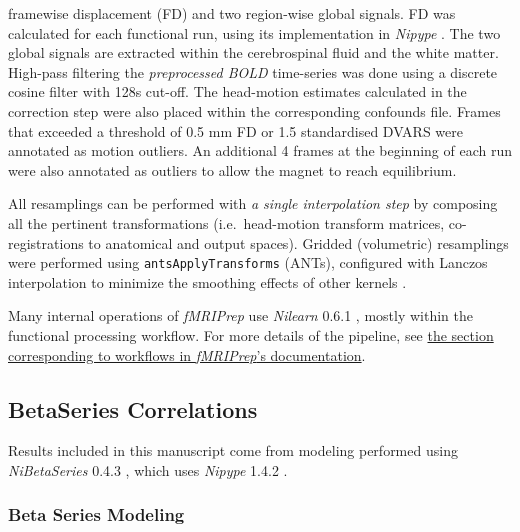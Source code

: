 \documentclass[10pt,letterpaper]{article}
\begin{document}
\begin{description}
framewise displacement (FD) and two region-wise global signals.
FD was calculated for each functional run, using its
implementation in \emph{Nipype} \cite[following the definitions
by]{power_fd_dvars}.
The two global signals are extracted within the
cerebrospinal fluid and the white matter.
High-pass filtering the \emph{preprocessed BOLD} time-series was done using
a discrete cosine filter with 128s cut-off.
The head-motion estimates calculated in
the correction step were also placed within the corresponding confounds file. 
Frames that exceeded a threshold of 0.5 mm FD or 1.5 standardised DVARS
were annotated as motion outliers.
An additional 4 frames at the beginning of each run were also
annotated as outliers to allow the magnet to reach equilibrium.

All resamplings can be performed with \emph{a single interpolation step} by composing all the pertinent
transformations (i.e.~head-motion transform matrices, co-registrations to anatomical
and output spaces).
Gridded (volumetric) resamplings were performed using \texttt{antsApplyTransforms} (ANTs),
configured with Lanczos interpolation to minimize the smoothing effects of other kernels
\cite{lanczos}.
\end{description}

Many internal operations of \emph{fMRIPrep} use \emph{Nilearn} 0.6.1
\cite[RRID:SCR\_001362]{nilearn}, mostly within the functional
processing workflow. For more details of the pipeline, see
\href{https://fmriprep.readthedocs.io/en/latest/workflows.html}{the
section corresponding to workflows in \emph{fMRIPrep}'s documentation}.

\subsection{BetaSeries Correlations}

Results included in this manuscript come from modeling performed using
\emph{NiBetaSeries} 0.4.3 \cite{Kent2018}, which uses
\emph{Nipype} 1.4.2 \cite{Gorgolewski2011, Gorgolewski2018}.

\hypertarget{beta-series-modeling}{%
\subsubsection{Beta Series Modeling}\label{beta-series-modeling}}
\end{document}
